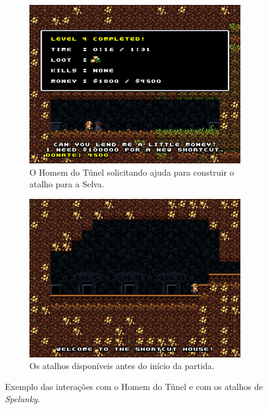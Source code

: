\begin{figure}[htb!]
\centering
	\begin{subfigure}[b]{0.4\textwidth}
		\includegraphics[width=\textwidth]{fig/spelunky-tunnelman.png}
		\caption{O Homem do Túnel solicitando ajuda para construir o atalho para
		a Selva.}
		\label{fig:spelunky-tunnelman}
	\end{subfigure}
	\begin{subfigure}[b]{0.4\textwidth}
		\includegraphics[width=\textwidth]{fig/spelunky-shortcuts.png}
		\caption{Os atalhos disponíveis antes do início da partida.}
		\label{fig:spelunky-shortcuts}
	\end{subfigure}
	\caption{Exemplo das interações com o Homem do Túnel e com os atalhos de
	\textit{Spelunky}.}
	\label{fig:spelunky-shortcuts-example}
\end{figure}

